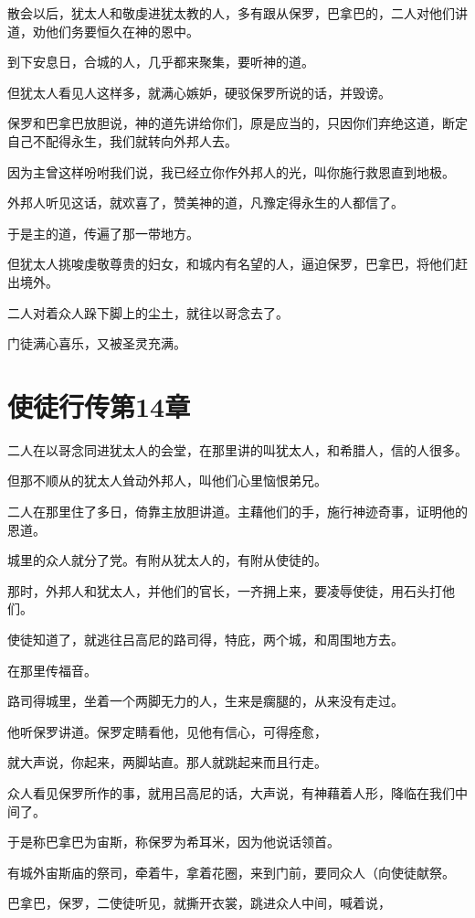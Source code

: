 \documentclass[12pt,oneside]{book}
\begin{document}
散会以后，犹太人和敬虔进犹太教的人，多有跟从保罗，巴拿巴的，二人对他们讲道，劝他们务要恒久在神的恩中。

到下安息日，合城的人，几乎都来聚集，要听神的道。

但犹太人看见人这样多，就满心嫉妒，硬驳保罗所说的话，并毁谤。

保罗和巴拿巴放胆说，神的道先讲给你们，原是应当的，只因你们弃绝这道，断定自己不配得永生，我们就转向外邦人去。

因为主曾这样吩咐我们说，我已经立你作外邦人的光，叫你施行救恩直到地极。

外邦人听见这话，就欢喜了，赞美神的道，凡豫定得永生的人都信了。

于是主的道，传遍了那一带地方。

但犹太人挑唆虔敬尊贵的妇女，和城内有名望的人，逼迫保罗，巴拿巴，将他们赶出境外。

二人对着众人跺下脚上的尘土，就往以哥念去了。

门徒满心喜乐，又被圣灵充满。

\chapter{使徒行传第14章}
二人在以哥念同进犹太人的会堂，在那里讲的叫犹太人，和希腊人，信的人很多。

但那不顺从的犹太人耸动外邦人，叫他们心里恼恨弟兄。

二人在那里住了多日，倚靠主放胆讲道。主藉他们的手，施行神迹奇事，证明他的恩道。

城里的众人就分了党。有附从犹太人的，有附从使徒的。

那时，外邦人和犹太人，并他们的官长，一齐拥上来，要凌辱使徒，用石头打他们。

使徒知道了，就逃往吕高尼的路司得，特庇，两个城，和周围地方去。

在那里传福音。

路司得城里，坐着一个两脚无力的人，生来是瘸腿的，从来没有走过。

他听保罗讲道。保罗定睛看他，见他有信心，可得痊愈，

就大声说，你起来，两脚站直。那人就跳起来而且行走。

众人看见保罗所作的事，就用吕高尼的话，大声说，有神藉着人形，降临在我们中间了。

于是称巴拿巴为宙斯，称保罗为希耳米，因为他说话领首。

有城外宙斯庙的祭司，牵着牛，拿着花圈，来到门前，要同众人（向使徒献祭。

巴拿巴，保罗，二使徒听见，就撕开衣裳，跳进众人中间，喊着说，
\end{document}
